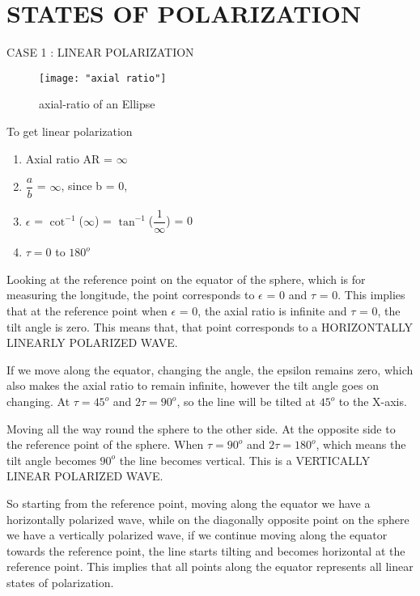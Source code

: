	\section{STATES OF POLARIZATION}
	CASE 1 : LINEAR POLARIZATION\\
	
\begin{figure}[h]
	\centering
	\texttt{[image: "axial ratio"]}
	\caption{axial-ratio of an Ellipse}
	\label{fig:axial-ratio}
\end{figure}
	To get linear polarization
	
	\begin{enumerate}
		\item Axial ratio AR = $\infty$\\
		
		\item $\dfrac{a}{b}$ = $\infty$, since b = 0,\\
		
		\item $\epsilon$ = $\cot^{-1}$($\infty$) = $\tan^{-1}$($\dfrac{1}{\infty}$) = 0\\
		
		\item $\tau = 0  $ to $  180^{o} $
	\end{enumerate}
	Looking at the reference point on the equator of the sphere, which is for measuring the longitude, the point corresponds to $\epsilon$ = 0 and $\tau$ = 0. This implies that at the reference point when $\epsilon$ = 0, the axial ratio is infinite and $\tau$ = 0, the tilt angle is zero. This means that, that point corresponds to a HORIZONTALLY LINEARLY POLARIZED WAVE.
	
	If we move along the equator, changing the angle, the epsilon remains zero, which also makes the axial ratio to remain infinite, however the tilt angle goes on changing. At $\tau = 45^{o}$ and $2\tau = 90^{o}$, so the line will be tilted at $45^{o}$ to the X-axis.
	
	Moving all the way round the sphere to the other side. At the opposite side to the reference point of the sphere. When $\tau = 90^{o}$ and $2\tau = 180^{o}$, which means the tilt angle becomes $90^{o}$ the line becomes vertical. This is a VERTICALLY LINEAR POLARIZED WAVE. 
	
	So starting from the reference point, moving along the equator we have a horizontally polarized wave, while on the diagonally opposite point on the sphere we have a vertically polarized wave, if we continue moving along the equator towards the reference point, the line starts tilting and becomes horizontal at the reference point. This implies that all points along the equator represents all linear states of polarization.\\
	\\
	
